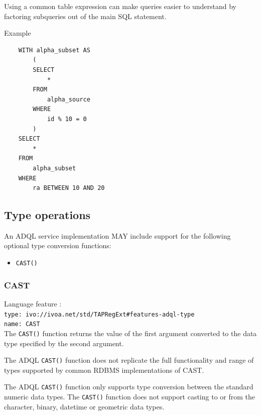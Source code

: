 \documentclass[11pt,a4paper]{ivoa}
\begin{document}
Using a common table expression can make queries easier to understand by factoring
subqueries out of the main SQL statement.

Example 
\begin{verbatim}
    WITH alpha_subset AS
        (
        SELECT
            *
        FROM
            alpha_source
        WHERE
            id % 10 = 0
        )
    SELECT
        *
    FROM
        alpha_subset
    WHERE
        ra BETWEEN 10 AND 20
\end{verbatim}

\subsection{Type operations}
\label{sec:type}

An ADQL service implementation MAY include support for the following optional
type conversion functions:

\begin{itemize}
    \item \verb:CAST():
\end{itemize}

\subsubsection{CAST}
\label{sec:type.cast}
{\footnotesize Language feature :}\\
{\footnotesize \verb|type: ivo://ivoa.net/std/TAPRegExt#features-adql-type|}\\
{\footnotesize \verb|name: CAST|}\\

The \verb:CAST(): function returns the value of the first argument converted
to the data type specified by the second argument.

The ADQL \verb:CAST(): function does not replicate the full functionality
and range of types supported by common RDBMS implementations of CAST.

The ADQL \verb:CAST(): function only supports type conversion between the
standard numeric data types. The \verb:CAST(): function does not support
casting to or from the character, binary, datetime or geometric data types.
\end{document}
